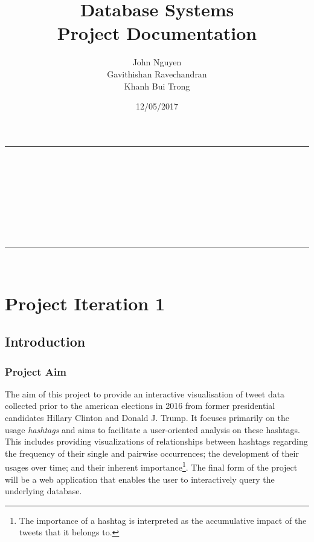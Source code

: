 \documentclass[a4paper, 12pt]{report}
\makeatletter
\newcommand{\LINE}{\rule{\linewidth}{0.5pt}}
\renewcommand{\maketitle}{
\vspace*{20pt}
\LINE\\
\vspace{2pt}\\
{\huge \noindent\sffamily{\@title}}\\
\vspace{2pt}\\
\hfill {\large \@date}\\
\vspace{2pt}\\
{\large \@author}\\
\LINE\\
\vspace{4pt}
}
\makeatother
\begin{document}
\title{\textbf{Database Systems}\\Project Documentation}
\date{12/05/2017}
\author{John Nguyen\\Gavithishan Ravechandran\\Khanh Bui Trong}
\maketitle
\thispagestyle{empty}


\chapter{Project Iteration 1}
\label{ch:iteration1}

\newpage
\section{Introduction}
\subsection{Project Aim}
The aim of this project to provide an interactive visualisation of tweet data collected prior to the american elections in 2016 from former presidential candidates Hillary Clinton and Donald J. Trump. It focuses primarily on the usage \emph{hashtags} and aims to facilitate a user-oriented analysis on these hashtags. This includes providing visualizations of relationships between hashtags regarding the frequency of their single and pairwise occurrences; the development of their usages over time; and their inherent importance\footnote{The importance of a hashtag is interpreted as the accumulative impact of the tweets that it belongs to.}. The final form of the project will be a web application that enables the user to interactively query the underlying database.
\end{document}
